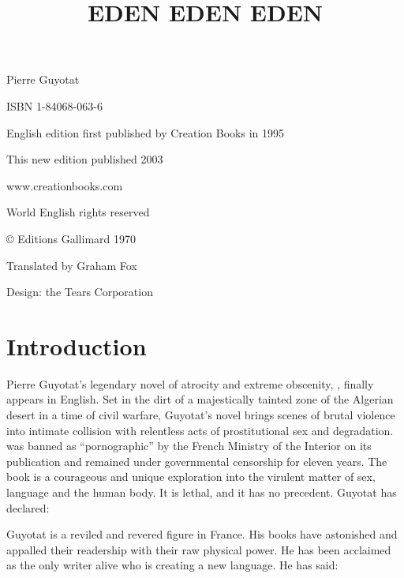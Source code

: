 \documentclass[10pt,twoside]{memoir}
\begin{document}
\graphicspath{{img/}}

\frontmatter

{
\title{EDEN EDEN EDEN}

}

\clearpage

{

Pierre Guyotat

ISBN 1-84068-063-6

English edition first published by Creation Books in 1995

This new edition published 2003

www.creationbooks.com

World English rights reserved

© Editions Gallimard 1970

Translated by Graham Fox

Design: the Tears Corporation
}

\clearpage

\chapter{Introduction}

Pierre Guyotat's legendary novel of atrocity and extreme obscenity, , finally appears in English. Set in the dirt of a majestically tainted zone of the Algerian desert in a time of civil warfare, Guyotat's novel brings scenes of brutal violence into intimate collision with relentless acts of prostitutional sex and degradation.  was banned as \enquote{pornographic} by the French Ministry of the Interior on its publication and remained under governmental censorship for eleven years. The book is a courageous and unique exploration into the virulent matter of sex, language and the human body. It is lethal, and it has no precedent. Guyotat has declared: 

Guyotat is a reviled and revered figure in France. His books have astonished and appalled their readership with their raw physical power. He has been acclaimed as the only writer alive who is creating a new language. He has said: 
\end{document}
